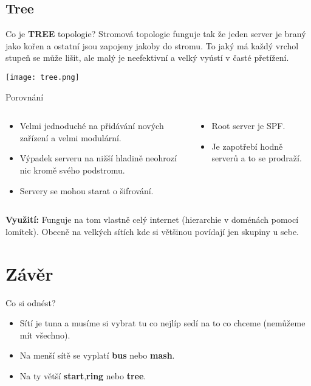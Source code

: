 \documentclass{beamer}
\begin{document}
\subsection{Tree}
\label{sec:tree}

\begin{frame}{Co je \textbf{TREE} topologie?}
    Stromová topologie funguje tak že jeden server je braný jako kořen a ostatní
    jsou zapojeny jakoby do stromu. To jaký má každý vrchol stupeň se může lišit,
    ale malý je neefektivní a velký vyústí v časté přetížení.

    \texttt{[image: tree.png]}
\end{frame}

\begin{frame}{Porovnání}

\begin{columns}
    \begin{column}{0.45\textwidth}
        \begin{itemize}
         \item Velmi jednoduché na přidávání nových zařízení a velmi modulární.
         \item Výpadek serveru na nižší hladině neohrozí nic kromě svého
             podstromu.
         \item Servery se mohou starat o šifrování.

        \end{itemize}
    \end{column}
    \begin{column}{0.45\textwidth}  %
        \begin{itemize}
            \item  Root server je SPF.
            \item Je zapotřebí hodně serverů a to se prodraží.
        \end{itemize}
    \end{column}
    \end{columns}
    \vspace{10pt}

\textbf{Využití:} Funguje na tom vlastně celý internet (hierarchie v doménách
pomocí lomítek). Obecně na velkých sítích kde si většinou povídají jen skupiny u
sebe.

\end{frame}

\section{Závěr}
\label{sec:zaver}

\begin{frame}{Co si odnést?}
 \begin{itemize}
  \item Sítí je tuna a musíme si vybrat tu co nejlíp sedí na to co chceme
      (nemůžeme mít všechno).
  \item Na menší sítě se vyplatí \textbf{bus} nebo \textbf{mash}.
  \item Na ty větší \textbf{start},\textbf{ring} nebo \textbf{tree}.
 \end{itemize}
 
\end{frame}
\end{document}
